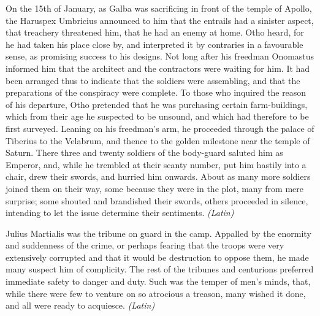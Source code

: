 On the 15th of January, as Galba was sacrificing in front of the temple of Apollo, the Haruspex Umbricius announced to him that the entrails had a sinister aspect, that treachery threatened him, that he had an enemy at home. Otho heard, for he had taken his place close by, and interpreted it by contraries in a favourable sense, as promising success to his designs. Not long after his freedman Onomastus informed him that the architect and the contractors were waiting for him. It had been arranged thus to indicate that the soldiers were assembling, and that the preparations of the conspiracy were complete. To those who inquired the reason of his departure, Otho pretended that he was purchasing certain farm-buildings, which from their age he suspected to be unsound, and which had therefore to be first surveyed. Leaning on his freedman's arm, he proceeded through the palace of Tiberius to the Velabrum, and thence to the golden milestone near the temple of Saturn. There three and twenty soldiers of the body-guard saluted him as Emperor, and, while he trembled at their scanty number, put him hastily into a chair, drew their swords, and hurried him onwards. About as many more soldiers joined them on their way, some because they were in the plot, many from mere surprise; some shouted and brandished their swords, others proceeded in silence, intending to let the issue determine their sentiments. \emph{(Latin)}


Julius Martialis was the tribune on guard in the camp. Appalled by the enormity and suddenness of the crime, or perhaps fearing that the troops were very extensively corrupted and that it would be destruction to oppose them, he made many suspect him of complicity. The rest of the tribunes and centurions preferred immediate safety to danger and duty. Such was the temper of men's minds, that, while there were few to venture on so atrocious a treason, many wished it done, and all were ready to acquiesce. \emph{(Latin)}


